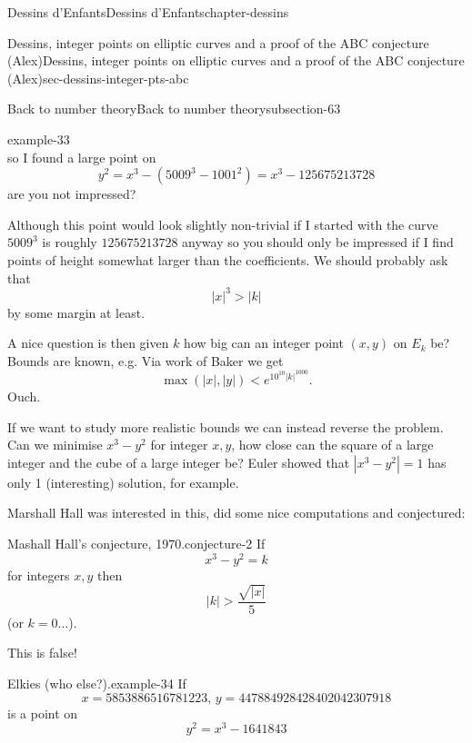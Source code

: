 \documentclass[oneside,10pt,]{book}
\numberwithin{equation}{section}
\newcommand{\lt}{<}
\newcommand{\gt}{>}
\begin{document}
\begin{chapterptx}{Dessins d'Enfants}{}{Dessins d'Enfants}{}{}{chapter-dessins}
\begin{sectionptx}{Dessins, integer points on elliptic curves and a proof of the ABC conjecture (Alex)}{}{Dessins, integer points on elliptic curves and a proof of the ABC conjecture (Alex)}{}{}{sec-dessins-integer-pts-abc}
\begin{subsectionptx}{Back to number theory}{}{Back to number theory}{}{}{subsection-63}
\begin{example}{}{example-33}
\begin{equation*}
\end{equation*}
so I found a large point on%
\begin{equation*}
y^2 = x^3 - (5009^3 - 1001^2) = x^3 - 125675213728
\end{equation*}
are you not impressed?%
\end{example}
\hypertarget{p-708}{}%
Although this point would look slightly non-trivial if I started with the curve \(5009^3\) is roughly \(125675213728\) anyway so you should only be impressed if I find points of height somewhat larger than the coefficients. We should probably ask that%
\begin{equation*}
|x|^3 \gt |k|
\end{equation*}
by some margin at least.%
\par
\hypertarget{p-709}{}%
A nice question is then given \(k\) how big can an integer point \((x,y)\) on \(E_k\) be? Bounds are known, e.g.  Via work of Baker we get%
\begin{equation*}
\max(|x|, |y|) \lt e^{10^{10}|k|^{1000}}\text{.}
\end{equation*}
Ouch.%
\par
\hypertarget{p-710}{}%
If we want to study more realistic bounds we can instead reverse the problem. Can we minimise \(x^3 - y^2\) for integer \(x,y\), how close can the square of a large integer and the cube of a large integer be? Euler showed that \(|x^3 - y^2| = 1\) has only 1 (interesting) solution, for example.%
\par
\hypertarget{p-711}{}%
Marshall Hall was interested in this, did some nice computations and conjectured:%
\begin{conjecture}{Mashall Hall's conjecture, 1970.}{}{conjecture-2}%
\hypertarget{p-712}{}%
If%
\begin{equation*}
x^3 - y^2 = k
\end{equation*}
for integers \(x,y\) then%
\begin{equation*}
|k| \gt \frac{\sqrt{|x|}}{5}
\end{equation*}
(or \(k =0\)...).%
\end{conjecture}
\hypertarget{p-713}{}%
This is false!%
\begin{example}{Elkies (who else?).}{example-34}%
\hypertarget{p-714}{}%
If%
\begin{equation*}
x= 5853886516781223,\,y = 447884928428402042307918
\end{equation*}
is a point on%
\begin{equation*}
y^2 = x^3 - 1641843
\end{equation*}

\end{example}
\end{subsectionptx}
\end{sectionptx}
\end{chapterptx}
\end{document}
